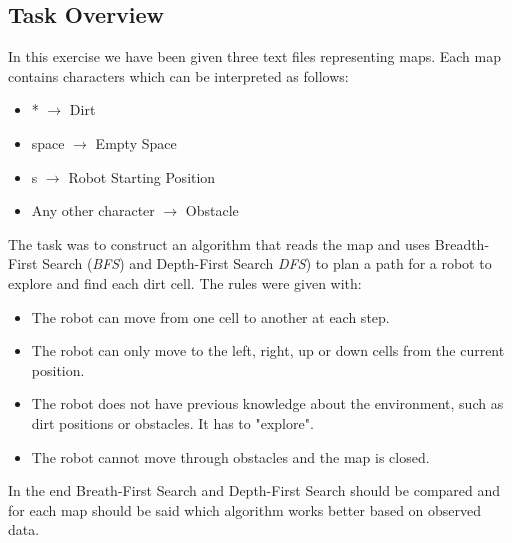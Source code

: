\documentclass[paper=a4, fontsize=11pt]{scrartcl} %
\numberwithin{equation}{section} %
\numberwithin{figure}{section} %
\numberwithin{table}{section} %
\begin{document}
\subsection{Task Overview}
In this exercise we have been given three text files representing maps.
Each map contains characters which can be interpreted as follows:
\begin{itemize}
\item * $\rightarrow$ Dirt
\item space $\rightarrow$ Empty Space
\item s $\rightarrow$ Robot Starting Position
\item Any other character $\rightarrow$ Obstacle
\end{itemize}
The task was to construct an algorithm that reads the map and uses Breadth-First Search (\emph{BFS}) and Depth-First Search \emph{DFS}) to plan a path for a robot to explore and find each dirt cell.
The rules were given with:
\begin{itemize}
\item The robot can move from one cell to another at each step.
\item The robot can only move to the left, right, up or down cells from the current position.
\item The robot does not have previous knowledge about the environment, such as dirt
positions or obstacles. It has to "explore".
\item The robot cannot move through obstacles and the map is closed.
\end{itemize}
In the end Breath-First Search and Depth-First Search should be compared and for each map 
should be said which algorithm works better based on observed data.
\end{document}
